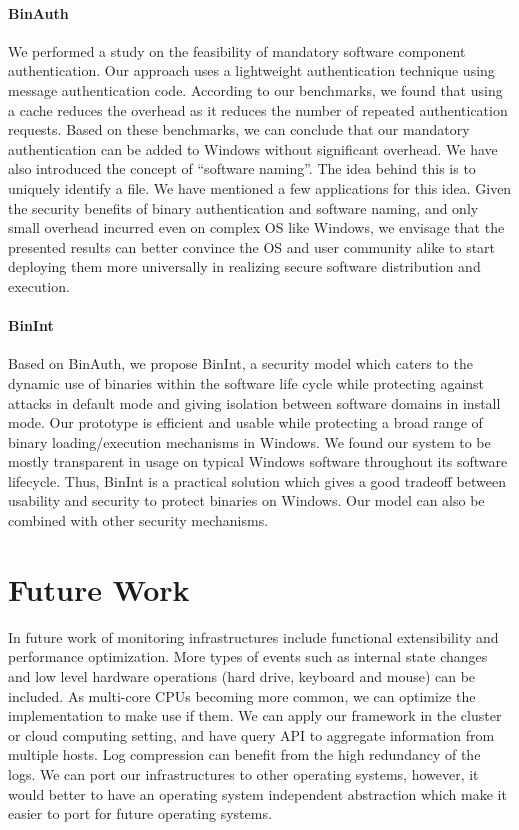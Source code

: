 \paragraph{BinAuth}
We performed a study on the feasibility of mandatory
software component authentication. Our approach uses a lightweight
authentication technique using message authentication code.
According to our benchmarks, we
found that using a cache reduces the overhead as it reduces
the number of repeated authentication requests.
Based on these benchmarks,
we can conclude that our mandatory authentication can be added to Windows
without significant overhead.
We have also introduced the concept of ``software naming''. The
idea behind this is to uniquely identify a file. We have mentioned a few
applications for this idea.
Given the security benefits of binary authentication and software naming,
and only small overhead incurred even on complex OS like Windows,
we envisage that the presented results can better convince
the OS and user community alike to start deploying them more universally
in realizing secure software distribution and execution.

\paragraph{BinInt}
Based on BinAuth, we propose BinInt, a security model which caters to the
dynamic use of binaries within the software life cycle
while protecting against attacks in default mode
and giving isolation between software domains in install mode.
Our prototype is efficient and usable while
protecting a broad range of binary loading/execution mechanisms in Windows.
We found our system to be mostly transparent in usage on typical
Windows software throughout its software lifecycle.
Thus, BinInt is a practical solution
which gives a good tradeoff between usability and security
to protect binaries on Windows.
Our model can also be combined with other security mechanisms.

\section{Future Work}
\label{sec:future}

In future work of monitoring infrastructures include functional
extensibility and performance optimization.
More types of events such as internal state changes and low level
hardware operations (hard drive, keyboard and mouse) can be included.
As multi-core CPUs becoming more common, we can optimize the
implementation to make use if them.
We can apply our framework in the cluster or cloud computing setting,
and have query API to aggregate information from multiple hosts.
Log compression can benefit from the high redundancy of the logs.
We can port our infrastructures to other operating systems,
however, it would better to have an operating system independent
abstraction which make it easier to port for future operating systems.

